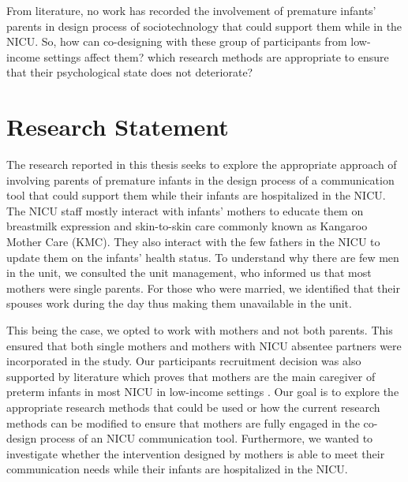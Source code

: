 From literature, no work has recorded the involvement of premature infants' parents in design process of sociotechnology that could support them while in the NICU. So, how can co-designing with these group of participants from low-income settings affect them? which research methods are appropriate to ensure that their psychological state does not deteriorate?

\section{Research Statement}
The research reported in this thesis seeks to explore the appropriate approach of involving parents of premature infants in the design process of a communication tool that could support them while their infants are hospitalized in the NICU. The NICU staff mostly interact with infants’ mothers to educate them on breastmilk expression and skin-to-skin care commonly known as Kangaroo Mother Care (KMC). They also interact with the few fathers in the NICU to update them on the infants’ health status. To understand why there are few men in the unit, we consulted the unit management, who informed us that most mothers were single parents. For those who were married, we identified that their spouses work during the day thus making them unavailable in the unit. 

This being the case, we opted to work with mothers and not both parents. This ensured that both single mothers and mothers with NICU absentee partners were incorporated in the study. Our participants recruitment decision was also supported by literature  which proves that mothers are the main caregiver of preterm infants in most NICU in low-income settings \textcite{Franck2003, McGrath2013}. Our goal is to explore the appropriate research methods that could be used or how the current research methods can be modified to ensure that mothers are fully engaged in the co-design process of an NICU communication tool. Furthermore, we wanted to investigate whether the intervention designed by mothers is able to meet their communication needs while their infants are hospitalized in the NICU.

